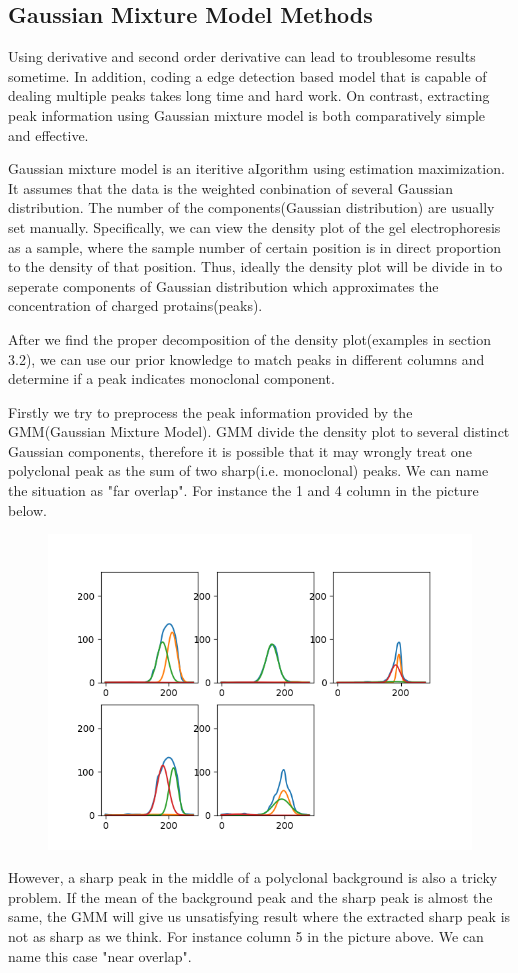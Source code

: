 \documentclass[12pt]{ctexart}
\begin{document}
\subsection{Gaussian Mixture Model Methods}
\par Using derivative and second order derivative can lead to troublesome results sometime. In addition, coding a edge detection based model that is capable of dealing multiple peaks takes long time and hard work. On contrast, extracting peak information using Gaussian mixture model is both comparatively simple and effective.
\par Gaussian mixture model is an iteritive aIgorithm using estimation maximization. It assumes that the data is the weighted conbination of several Gaussian distribution. The number of the components(Gaussian distribution) are usually set manually. Specifically, we can view the density plot of the gel electrophoresis as a sample, where the sample number of certain position is in direct proportion to the density of that position. Thus, ideally the density plot will be divide in to seperate components of Gaussian distribution which approximates the concentration of charged protains(peaks).
\par After we find the proper decomposition of the density plot(examples in section 3.2), we can use our prior knowledge to match peaks in different columns and determine if a peak indicates monoclonal component.
\par Firstly we try to preprocess the peak information provided by the GMM(Gaussian Mixture Model). GMM divide the density plot to several distinct Gaussian components, therefore it is possible that it may wrongly treat one polyclonal peak as the sum of two sharp(i.e. monoclonal) peaks. We can name the situation as "far overlap". For instance the 1 and 4 column in the picture below.
\begin{figure}[H]
    \centering
    \includegraphics[width=0.5\linewidth]{f.png}
\end{figure}
\par However, a sharp peak in the middle of a polyclonal background is also a tricky problem. If the mean of the background peak and the sharp peak is almost the same, the GMM will give us unsatisfying result where the extracted sharp peak is not as sharp as we think. For instance column 5 in the picture above. We can name this case "near overlap".
\end{document}
